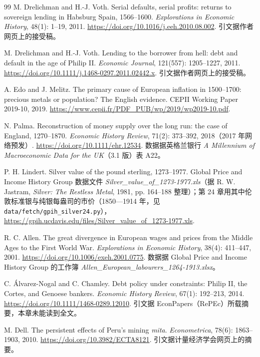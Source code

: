 \begin{thebibliography}{99}
 M. Drelichman and H.-J. Voth. Serial defaults, serial profits: returns to sovereign lending in Habsburg Spain, 1566--1600. \emph{Explorations in Economic History}, 48(1): 1--19, 2011. \url{https://doi.org/10.1016/j.eeh.2010.08.002}. 引文据作者网页上的接受稿。

 M. Drelichman and H.-J. Voth. Lending to the borrower from hell: debt and default in the age of Philip II. \emph{Economic Journal}, 121(557): 1205--1227, 2011. \url{https://doi.org/10.1111/j.1468-0297.2011.02442.x}. 引文据作者网页上的接受稿。

 A. Edo and J. Melitz. The primary cause of European inflation in 1500--1700: precious metals or population? The English evidence. CEPII Working Paper 2019-10, 2019. \url{https://www.cepii.fr/PDF_PUB/wp/2019/wp2019-10.pdf}.

 N. Palma. Reconstruction of money supply over the long run: the case of England, 1270--1870. \emph{Economic History Review}, 71(2): 373--392, 2018（2017 年网络预发）. \url{https://doi.org/10.1111/ehr.12534}. 数据据英格兰银行 \emph{A Millennium of Macroeconomic Data for the UK}（3.1 版）表 A22。

 P. H. Lindert. Silver value of the pound sterling, 1273--1977. Global Price and Income History Group 数据文件 \emph{Silver\_value\_of\_1273-1977.xls}（据 R. W. Jastram, \emph{Silver: The Restless Metal}, 1981, pp. 164--188 整理）；第 24 章用其中伦敦标准银与纯银每盎司的市价（1850—1914 年，见 \texttt{data/fetch/gpih\_silver24.py}），\url{https://gpih.ucdavis.edu/files/Silver_value_of_1273-1977.xls}.

 R. C. Allen. The great divergence in European wages and prices from the Middle Ages to the First World War. \emph{Explorations in Economic History}, 38(4): 411--447, 2001. \url{https://doi.org/10.1006/exeh.2001.0775}. 数据据 Global Price and Income History Group 的工作簿 \emph{Allen\_European\_labourers\_1264-1913.xlsx}。

 C. Álvarez-Nogal and C. Chamley. Debt policy under constraints: Philip II, the Cortes, and Genoese bankers. \emph{Economic History Review}, 67(1): 192--213, 2014. \url{https://doi.org/10.1111/1468-0289.12010}. 引文据 EconPapers（RePEc）所载摘要，本章未能读到全文。

 M. Dell. The persistent effects of Peru's mining \emph{mita}. \emph{Econometrica}, 78(6): 1863--1903, 2010. \url{https://doi.org/10.3982/ECTA8121}. 引文据计量经济学会网页上的摘要。


\end{thebibliography}
